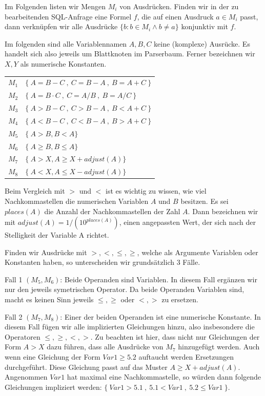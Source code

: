 Im Folgenden listen wir Mengen $M_i$ von Ausdrücken. Finden wir in der zu bearbeitenden SQL-Anfrage eine Formel $f$, die auf einen Ausdruck $a\in M_i$ passt, dann verknüpfen wir alle Ausdrücke $\{b : b\in M_i \wedge b \neq a\}$ konjunktiv mit $f$.

Im folgenden sind alle Variablennamen $A,B,C$ keine (komplexe) Ausrücke. Es handelt sich also jeweils um Blattknoten im Parserbaum. Ferner bezeichnen wir $X,Y$ als numerische Konstanten.\\

\begin{tabular}{ll}
$M_1$ & $\{\ A=B-C\ ,\ C=B-A\ ,\ B=A+C\ \}$\\
$M_2$ & $\{\ A=B\cdot C\ ,\ C=A / B\ ,\ B=A / C\ \}$\\
$M_3$ & $\{\ A>B-C\ ,\ C>B-A\ ,\ B<A+C\ \}$\\
$M_4$ & $\{\ A<B-C\ ,\ C<B-A\ ,\ B>A+C\ \}$\\
$M_5$ & $\{\ A>B, B<A \}$\\
$M_6$ & $\{\ A\geq B, B\leq A \}$\\
$M_7$ & $\{\ A>X, A\geq X+\mathit{adjust}(A) \}$\\
$M_8$ & $\{\ A<X, A\leq X-\mathit{adjust}(A) \}$\\

\end{tabular}

Beim Vergleich mit $>$ und $<$ ist es wichtig zu wissen, wie viel Nachkommastellen die numerischen Variablen $A$ und $B$ besitzen. Es sei $\mathit{places}(A)$ die Anzahl der Nachkommastellen der Zahl $A$. Dann bezeichnen wir mit $\mathit{adjust}(A) = 1 / (10^{\mathit{places}(A)})$, einen angepassten Wert, der sich nach der Stelligkeit der Variable A richtet.

Finden wir Ausdrücke mit $>,<,\leq,\geq$, welche als Argumente Variablen oder Konstanten haben, so unterscheiden wir grundsätzlich 3 Fälle.

Fall 1 $(M_5,M_6)$: Beide Operanden sind Variablen. In diesem Fall ergänzen wir nur den jeweils symetrischen Operator. Da beide Operanden Variablen sind, macht es keinen Sinn jeweils $\leq,\geq$ oder $<,>$ zu ersetzen.

Fall 2 $(M_7,M_8)$: Einer der beiden Operanden ist eine numerische Konstante. In diesem Fall fügen wir alle implizierten Gleichungen hinzu, also insbesondere die Operatoren $\leq,\geq,<,>$. Zu beachten ist hier, dass nicht nur Gleichungen der Form $A>X$ dazu führen, dass alle Ausdrücke von $M_7$ hinzugefügt werden. Auch wenn eine Gleichung der Form $Var1\geq 5.2$ auftaucht werden Ersetzungen durchgeführt. Diese Gleichung passt auf das Muster $A\geq X+\mathit{adjust}(A)$. Angenommen $Var1$ hat maximal eine Nachkommastelle, so würden dann folgende Gleichungen impliziert werden: $\{\ Var1>5.1\ ,\ 5.1<Var1\ ,\ 5.2 \leq Var1\ \}$.

